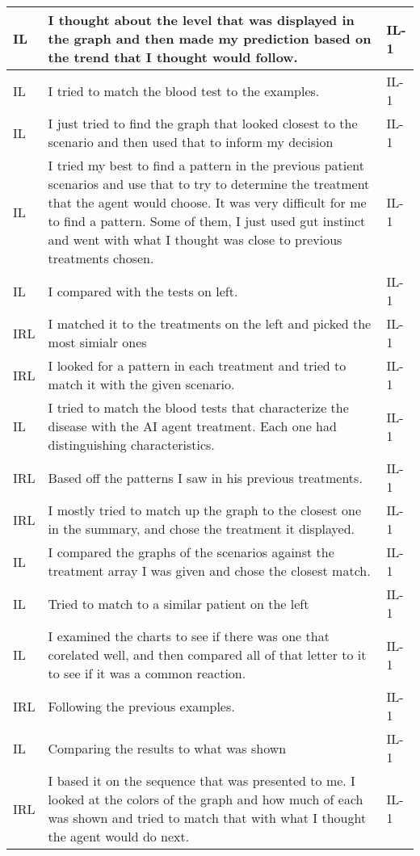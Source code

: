 \documentclass{article}
\begin{document}
\begin{longtable}{ | m{0.6in} | m{5in}| m{0.6in} | }
IL & I thought about the level that was displayed in the graph and then made my prediction based on the trend that I thought would follow. & IL-1 \\ \hline
IL & I tried to match the blood test to the examples. & IL-1 \\ \hline
IL & I just tried to find the graph that looked closest to the scenario and then used that to inform my decision & IL-1 \\ \hline
IL & I tried my best to find a pattern in the previous patient scenarios and use that to try to determine the treatment that the agent would choose. It was very difficult for me to find a pattern. Some of them, I just used gut instinct and went with what I thought was close to previous treatments chosen. & IL-1 \\ \hline
IL & I compared with the tests on left. & IL-1 \\ \hline
IRL & I matched it to the treatments on the left and picked the most simialr ones & IL-1 \\ \hline
IRL & I looked for a pattern in each treatment and tried to match it with the given scenario. & IL-1 \\ \hline
IL & I tried to match the blood tests that characterize the disease with the AI agent treatment. Each one had distinguishing characteristics. & IL-1 \\ \hline
IRL & Based off the patterns I saw in his previous treatments. & IL-1 \\ \hline
IRL & I mostly tried to match up the graph to the closest one in the summary, and chose the treatment it displayed. & IL-1 \\ \hline
IL & I compared the graphs of the scenarios against the treatment array I was given and chose the closest match. & IL-1 \\ \hline
IL & Tried to match to a similar patient on the left & IL-1 \\ \hline
IL & I examined the charts to see if there was one that corelated well, and then compared all of that letter to it to see if it was a common reaction. & IL-1 \\ \hline
IRL & Following the previous examples. & IL-1 \\ \hline
IL & Comparing the results to what was shown & IL-1 \\ \hline
IRL & I based it on the sequence that was presented to me. I looked at the colors of the graph and how much of each was shown and tried to match that with what I thought the agent would do next.  & IL-1 \\ \hline

\end{longtable}
\end{document}
